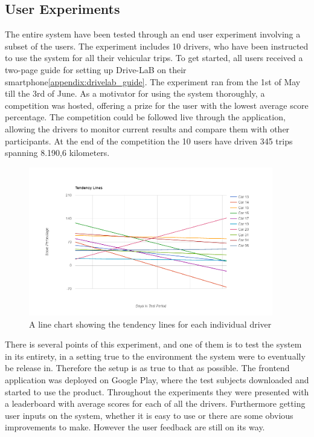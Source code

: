 \subsection{User Experiments}\label{subsec:userexp}

The entire system have been tested through an end user experiment involving a subset of the users. The experiment includes 10 drivers, who have been instructed to use the system for all their vehicular trips. To get started, all users received a two-page guide for setting up Drive-LaB on their smartphone\ref{appendix:drivelab_guide}. The experiment ran from the 1st of May till the 3rd of June. As a motivator for using the system thoroughly, a competition was hosted, offering a prize for the user with the lowest average score percentage. The competition could be followed live through the application, allowing the drivers to monitor current results and compare them with other participants. At the end of the competition the 10 users have driven 345 trips spanning 8.190,6 kilometers.

\begin{figure}[tb]
\centering
\includegraphics[width=0.95\textwidth]{Pictures/tendenslinjer}
\caption{A line chart showing the tendency lines for each individual driver}
\label{fig:tendencylines}
\end{figure}

There is several points of this experiment, and one of them is to test the system in its entirety, in a setting true to the environment the system were to eventually be release in. Therefore the setup is as true to that as possible. The frontend application was deployed on Google Play, where the test subjects downloaded and started to use the product. Throughout the experiments they were presented with a leaderboard with average scores for each of all the drivers. 
Furthermore getting user inputs on the system, whether it is easy to use or there are some obvious improvements to make. However the user feedback are still on its way.

